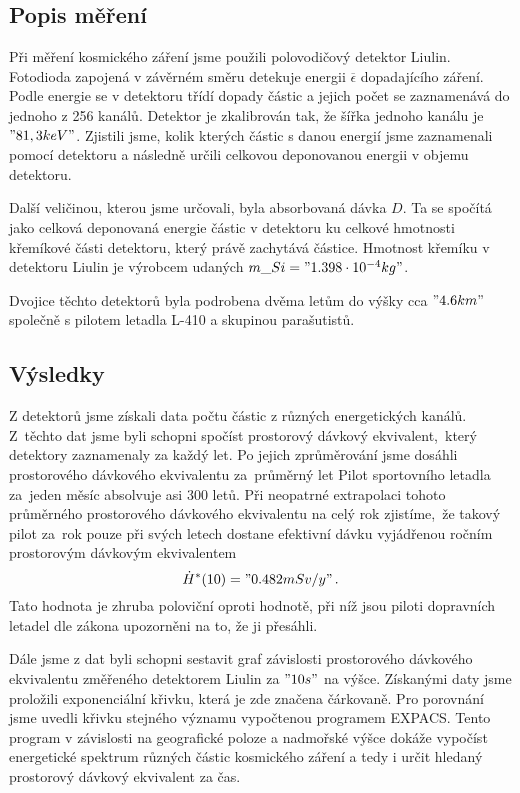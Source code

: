 \documentclass[12pt,a4paper]{article}
\begin{document}
\subsection*{Popis měření}
Při měření kosmického záření jsme použili polovodičový detektor Liulin. Fotodioda zapojená v závěrném směru
detekuje energii $ \overline{\epsilon} $ dopadajícího záření. Podle energie se v detektoru třídí dopady
částic a jejich počet se zaznamenává do jednoho z 256 kanálů. Detektor je zkalibrován tak, že šířka jednoho
kanálu je $"81,3 keV"$. Zjistili jsme, kolik kterých částic s danou energií jsme zaznamenali pomocí detektoru a
následně určili celkovou deponovanou energii v objemu detektoru.\par
Další veličinou, kterou jsme určovali, byla absorbovaná dávka $D$. Ta se spočítá jako celková deponovaná
energie částic v detektoru ku celkové hmotnosti křemíkové části detektoru, který právě zachytává částice.
Hmotnost křemíku v detektoru Liulin je výrobcem udaných $m\_{Si}="1.398\cdot 10^{-4} kg"$.\par
Dvojice těchto detektorů byla podrobena dvěma letům do výšky cca $"4.6 km"$ společně s pilotem letadla
L-410 a skupinou parašutistů.
\subsection*{Výsledky}
Z detektorů jsme získali data počtu částic z různých energetických kanálů.
Z~těchto dat jsme byli schopni spočíst prostorový dávkový ekvivalent,~který
detektory zaznamenaly za každý let. Po jejich zprůměrování jsme dosáhli
prostorového dávkového ekvivalentu za~průměrný let
Pilot sportovního letadla za~jeden měsíc absolvuje asi 300 letů. Při neopatrné
extrapolaci tohoto průměrného prostorového dávkového ekvivalentu na celý rok
zjistíme,~že takový pilot za~rok pouze při svých letech dostane efektivní dávku
vyjádřenou ročním prostorovým dávkovým ekvivalentem
$$ \dot{H}^\ast(10)="0.482 mSv/y"\,. $$
Tato hodnota je zhruba poloviční oproti hodnotě, při níž jsou piloti dopravních
letadel dle zákona upozorněni na to, že ji přesáhli.\par
Dále jsme z dat byli schopni sestavit graf závislosti prostorového dávkového
ekvivalentu změřeného detektorem Liulin za $"10 s"$ na výšce. Získanými daty
jsme proložili exponenciální křivku, která je zde značena čárkovaně. Pro
porovnání jsme uvedli křivku stejného významu vypočtenou programem EXPACS.
Tento program v závislosti na geografické poloze a nadmořské výšce dokáže
vypočíst energetické spektrum různých částic kosmického záření a tedy i určit
hledaný prostorový dávkový ekvivalent za čas.
\end{document}
